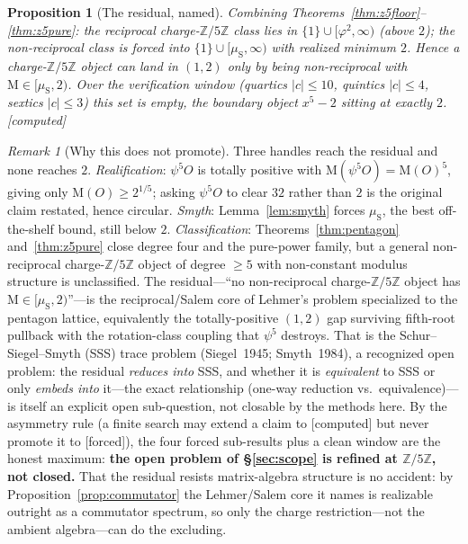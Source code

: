 \documentclass[11pt]{article}
\newtheorem{proposition}[theorem]{Proposition}
\theoremstyle{definition}
\theoremstyle{remark}
\newtheorem{remark}[theorem]{Remark}
\newcommand{\Mah}{\mathrm{M}}
\newcommand{\Z}{\mathbb{Z}}
\newcommand{\Adams}[1]{\psi^{#1}}
\newcommand{\gold}{\varphi}
\newcommand{\Zmod}[1]{\Z/#1\Z}
\newcommand{\status}[1]{{\small\textsf{[#1]}}}
\newcommand{\forced}{\status{forced}}
\newcommand{\computed}{\status{computed}}
\newcommand{\muS}{\mu_{\mathrm{S}}}
\begin{document}
\begin{proposition}[The residual, named]\label{prop:z5residual}
Combining Theorems~\ref{thm:z5floor}--\ref{thm:z5pure}: the reciprocal charge-$\Zmod5$ class
lies in $\{1\}\cup[\gold^{2},\infty)$ (above $2$); the non-reciprocal class is forced into
$\{1\}\cup[\muS,\infty)$ with realized minimum $2$. Hence a charge-$\Zmod5$ object can land in
$(1,2)$ \emph{only} by being non-reciprocal with $\Mah\in[\muS,2)$. Over the verification window
(quartics $|c|\le10$, quintics $|c|\le4$, sextics $|c|\le3$) this set is empty, the boundary
object $x^{5}-2$ sitting at exactly $2$. \computed{}
\end{proposition}
\begin{remark}[Why this does not promote]
Three handles reach the residual and none reaches $2$. \emph{Realification}: $\Adams5O$ is
totally positive with $\Mah(\Adams5O)=\Mah(O)^{5}$, giving only $\Mah(O)\ge2^{1/5}$; asking
$\Adams5O$ to clear $32$ rather than $2$ is the original claim restated, hence circular.
\emph{Smyth}: Lemma~\ref{lem:smyth} forces $\muS$, the best off-the-shelf bound, still below
$2$. \emph{Classification}: Theorems~\ref{thm:pentagon} and~\ref{thm:z5pure} close degree four
and the pure-power family, but a general non-reciprocal charge-$\Zmod5$ object of degree $\ge5$
with non-constant modulus structure is unclassified. The residual---``no non-reciprocal
charge-$\Zmod5$ object has $\Mah\in[\muS,2)$''---is the reciprocal/Salem core of Lehmer's
problem specialized to the pentagon lattice, equivalently the totally-positive $(1,2)$ gap
surviving fifth-root pullback with the rotation-class coupling that $\Adams5$ destroys. That is the
Schur--Siegel--Smyth (SSS) trace problem (Siegel~1945; Smyth~1984), a recognized open problem: the
residual \emph{reduces into} SSS, and whether it is \emph{equivalent} to SSS or only \emph{embeds
into} it---the exact relationship (one-way reduction vs.\ equivalence)---is itself an explicit open
sub-question, not closable by the methods here. By the
asymmetry rule (a finite search may extend a claim to \computed{} but never promote it to
\forced{}), the four forced sub-results plus a clean window are the honest maximum:
\textbf{the open problem of \S\ref{sec:scope} is refined at $\Zmod5$, not closed.} That the
residual resists matrix-algebra structure is no accident: by Proposition~\ref{prop:commutator}
the Lehmer/Salem core it names is realizable outright as a commutator spectrum, so only the
charge restriction---not the ambient algebra---can do the excluding.
\end{remark}
\end{document}
